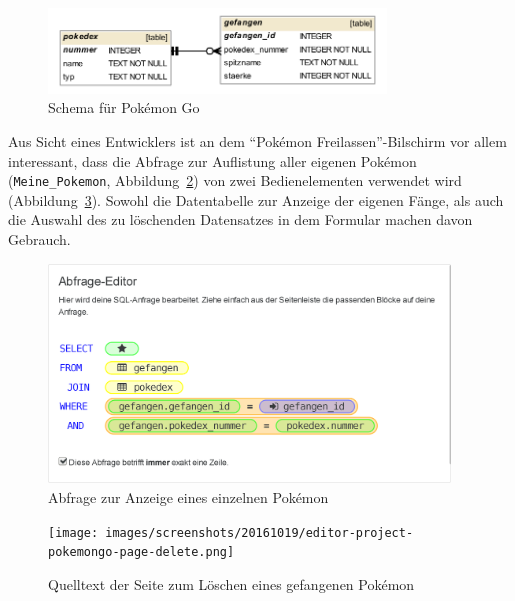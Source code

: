 \begin{figure}[h]
  \centering \includegraphics[width=0.8\textwidth]{images/db-schema/pokemongo}
  \caption{Schema für Pokémon Go}
  \label{fig:project-pokemongo-schema}
\end{figure}

Aus Sicht eines Entwicklers ist an dem "`Pokémon Freilassen"'-Bilschirm vor allem interessant, dass die Abfrage zur Auflistung aller eigenen Pokémon (\texttt{Meine\_Pokemon}, Abbildung~\ref{fig:project-pokemongo-query-single-pokemon}) von zwei Bedienelementen verwendet wird (Abbildung~\ref{fig:project-pokemongo-page-delete}). Sowohl die Datentabelle zur Anzeige der eigenen Fänge, als auch die Auswahl des zu löschenden Datensatzes in dem Formular machen davon Gebrauch.

\begin{figure}[p]
  \centering \includegraphics[width=0.95\textwidth]{images/screenshots/20161019/editor-project-pokemongo-query-single-pokemon}
  \caption{Abfrage zur Anzeige eines einzelnen Pokémon}
  \label{fig:project-pokemongo-query-single-pokemon}
\end{figure}

\begin{figure}[p]
  \centering \texttt{[image: images/screenshots/20161019/editor-project-pokemongo-page-delete.png]}
  \caption{Quelltext der Seite zum Löschen eines gefangenen Pokémon}
  \label{fig:project-pokemongo-page-delete}
\end{figure}

